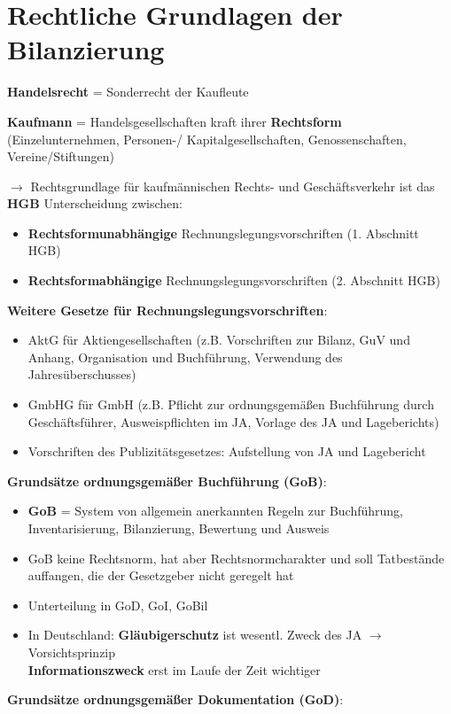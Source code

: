 \section{Rechtliche Grundlagen der Bilanzierung}

\textbf{Handelsrecht} = Sonderrecht der Kaufleute

\textbf{Kaufmann} = Handelsgesellschaften kraft ihrer \textbf{Rechtsform} (Einzelunternehmen, Personen-/ Kapitalgesellschaften, Genossenschaften, Vereine/Stiftungen)

$\rightarrow$ Rechtsgrundlage für kaufmännischen Rechts- und Geschäftsverkehr ist das \textbf{HGB}
Unterscheidung zwischen:
\begin{itemize}
	\item \textbf{Rechtsformunabhängige} Rechnungslegungsvorschriften (1. Abschnitt HGB)
	\item \textbf{Rechtsformabhängige} Rechnungslegungsvorschriften (2. Abschnitt HGB)
\end{itemize}
\textbf{Weitere Gesetze für Rechnungslegungsvorschriften}:
\begin{itemize}
	\item AktG für Aktiengesellschaften (z.B. Vorschriften zur Bilanz, GuV und Anhang, Organisation und Buchführung, Verwendung des Jahresüberschusses)
	\item GmbHG für GmbH (z.B. Pflicht zur ordnungsgemäßen Buchführung durch
	Geschäftsführer, Ausweispflichten im JA, Vorlage des JA und Lageberichts)
	\item Vorschriften des Publizitätsgesetzes: Aufstellung von JA und Lagebericht
\end{itemize}
\bigskip
\textbf{Grundsätze ordnungsgemäßer Buchführung (GoB)}: 
\begin{itemize}
	\item \textbf{GoB} = System von allgemein anerkannten Regeln zur Buchführung, Inventarisierung, Bilanzierung, Bewertung und Ausweis
	\item GoB keine Rechtsnorm, hat aber Rechtsnormcharakter und soll Tatbestände auffangen, die der Gesetzgeber nicht geregelt hat
	\item Unterteilung in GoD, GoI, GoBil
	\item In Deutschland: \textbf{Gläubigerschutz} ist wesentl. Zweck des JA $\rightarrow$ Vorsichtsprinzip\\
	\textbf{Informationszweck} erst im Laufe der Zeit wichtiger
\end{itemize}

\textbf{Grundsätze ordnungsgemäßer Dokumentation (GoD)}: